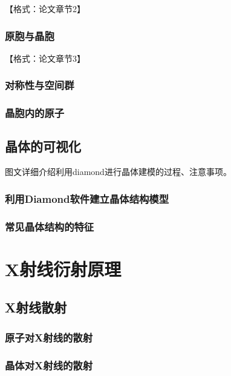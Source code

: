 \documentclass[12pt,a4paper,twoside]{ctexart}
\newcommand{\smtext}[1]{{\fontsize{9.3pt}{12pt}\selectfont #1}}
\begin{document}
\smtext{【格式：论文章节2】}

\subsubsection{原胞与晶胞}

\smtext{【格式：论文章节3】}

\subsubsection{对称性与空间群}

\subsubsection{晶胞内的原子}

\subsection{晶体的可视化}

\smtext{图文详细介绍利用diamond进行晶体建模的过程、注意事项。}

\subsubsection{利用Diamond软件建立晶体结构模型}

\subsubsection{常见晶体结构的特征}

\section{X射线衍射原理}

\subsection{X射线散射}

\subsubsection{原子对X射线的散射}

\subsubsection{晶体对X射线的散射}
\end{document}
